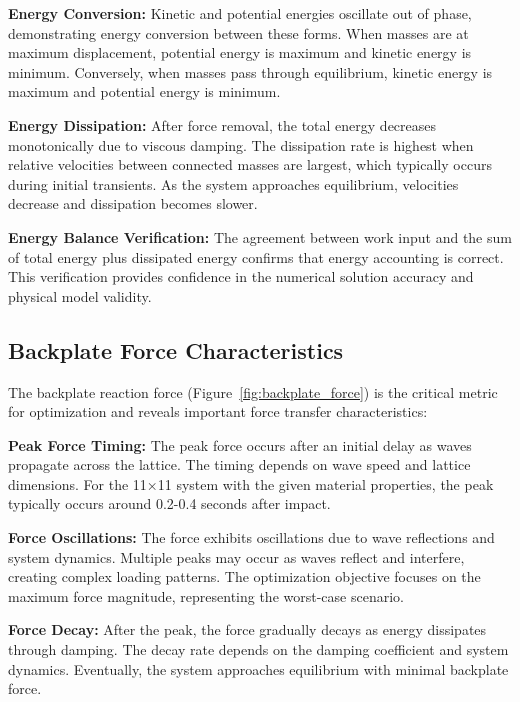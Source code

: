 \documentclass[11pt,a4paper]{article}
\begin{document}
\noindent \textbf{Energy Conversion:} Kinetic and potential energies oscillate out of phase, demonstrating energy conversion between these forms. When masses are at maximum displacement, potential energy is maximum and kinetic energy is minimum. Conversely, when masses pass through equilibrium, kinetic energy is maximum and potential energy is minimum. \newline

\noindent \textbf{Energy Dissipation:} After force removal, the total energy decreases monotonically due to viscous damping. The dissipation rate is highest when relative velocities between connected masses are largest, which typically occurs during initial transients. As the system approaches equilibrium, velocities decrease and dissipation becomes slower. \newline

\noindent \textbf{Energy Balance Verification:} The agreement between work input and the sum of total energy plus dissipated energy confirms that energy accounting is correct. This verification provides confidence in the numerical solution accuracy and physical model validity. \newline

\subsection{Backplate Force Characteristics}

\noindent The backplate reaction force (Figure~\ref{fig:backplate_force}) is the critical metric for optimization and reveals important force transfer characteristics: \newline

\noindent \textbf{Peak Force Timing:} The peak force occurs after an initial delay as waves propagate across the lattice. The timing depends on wave speed and lattice dimensions. For the 11×11 system with the given material properties, the peak typically occurs around 0.2-0.4 seconds after impact. \newline

\noindent \textbf{Force Oscillations:} The force exhibits oscillations due to wave reflections and system dynamics. Multiple peaks may occur as waves reflect and interfere, creating complex loading patterns. The optimization objective focuses on the maximum force magnitude, representing the worst-case scenario. \newline

\noindent \textbf{Force Decay:} After the peak, the force gradually decays as energy dissipates through damping. The decay rate depends on the damping coefficient and system dynamics. Eventually, the system approaches equilibrium with minimal backplate force. \newline
\end{document}
